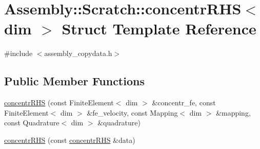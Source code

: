\hypertarget{struct_assembly_1_1_scratch_1_1concentr_r_h_s}{}\section{Assembly\+:\+:Scratch\+:\+:concentr\+R\+H\+S$<$ dim $>$ Struct Template Reference}
\label{struct_assembly_1_1_scratch_1_1concentr_r_h_s}


{\ttfamily \#include $<$assembly\+\_\+copydata.\+h$>$}

\subsection*{Public Member Functions}
\begin{DoxyCompactItemize}
\item 
\hyperlink{struct_assembly_1_1_scratch_1_1concentr_r_h_s_af8cd490e71848eda2821fa50503094bc}{concentr\+R\+H\+S} (const Finite\+Element$<$ dim $>$ \&concentr\+\_\+fe, const Finite\+Element$<$ dim $>$ \&fe\+\_\+velocity, const Mapping$<$ dim $>$ \&mapping, const Quadrature$<$ dim $>$ \&quadrature)
\item 
\hyperlink{struct_assembly_1_1_scratch_1_1concentr_r_h_s_a41cd0bab73e9eff227b5f26bd0cf5ac7}{concentr\+R\+H\+S} (const \hyperlink{struct_assembly_1_1_scratch_1_1concentr_r_h_s}{concentr\+R\+H\+S} \&data)
\end{DoxyCompactItemize}
